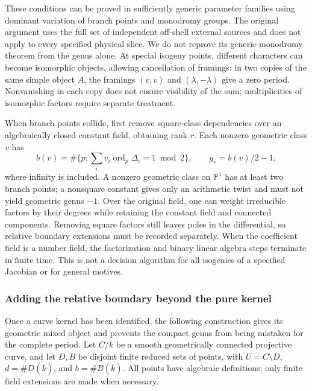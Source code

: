 \documentclass[11pt,a4paper,oneside]{article}
\theoremstyle{plain}
\theoremstyle{definition}
\theoremstyle{remark}
\numberwithin{equation}{section}
\begin{document}
These conditions can be proved in sufficiently generic parameter families using dominant variation of branch points and monodromy groups.
The original argument uses the full set of independent off-shell external sources and does not apply to every specified physical slice.
We do not reprove its generic-monodromy theorem from the genus alone.
At special isogeny points, different characters can become isomorphic objects, allowing cancellation of framings:
in two copies of the same simple object $A$, the framings $(v,v)$ and $(\lambda,-\lambda)$ give a zero period.
Nonvanishing in each copy does not ensure visibility of the sum; multiplicities of isomorphic factors require separate treatment.

When branch points collide, first remove square-class dependencies over an algebraically closed constant field, obtaining rank $r$.
Each nonzero geometric class $v$ has
\[
 b(v)=\#\{p:\sum_i v_i\operatorname{ord}_p\Delta_i=1\bmod2\},
 \qquad g_v=b(v)/2-1 ,
\]
where infinity is included. A nonzero geometric class on $\mathbb P^1$ has at least two branch points;
a nonsquare constant gives only an arithmetic twist and must not yield geometric genus $-1$.
Over the original field, one can weight irreducible factors by their degrees while retaining the constant field and connected components.
Removing square factors still leaves poles in the differential, so relative boundary extensions must be recorded separately.
When the coefficient field is a number field, the factorization and binary linear algebra steps terminate in finite time.
This is not a decision algorithm for all isogenies of a specified Jacobian or for general motives.

\subsubsection{Adding the relative boundary beyond the pure kernel}
Once a curve kernel has been identified, the following construction gives its geometric mixed object and prevents the compact genus from being mistaken for the complete period.
Let $C/k$ be a smooth geometrically connected projective curve, and let $D,B$ be disjoint finite reduced sets of points, with
$U=C\setminus D$, $d=\#D(\bar k)$, and $b=\#B(\bar k)$.
All points have algebraic definitions; only finite field extensions are made when necessary.
\end{document}
